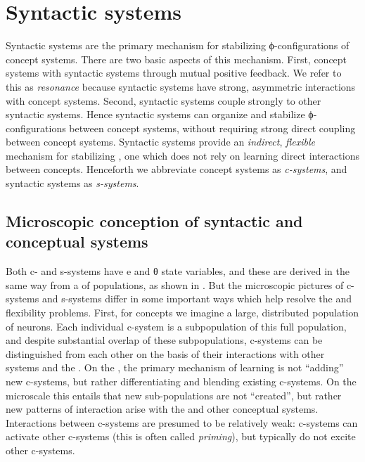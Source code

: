 \section{Syntactic systems}

Syntactic systems are the primary mechanism for stabilizing ϕ-configurations of concept systems. There are two basic aspects of this mechanism. First, concept systems  with syntactic systems through mutual positive feedback. We refer to this as \textit{resonance} because syntactic systems have strong, asymmetric interactions with concept systems. Second, syntactic systems couple strongly to other syntactic systems. Hence syntactic systems can organize and stabilize ϕ-configurations between concept systems, without requiring strong direct coupling between concept systems. Syntactic systems provide an \textit{indirect}, \textit{flexible} mechanism for stabilizing , one which does not rely on learning direct interactions between concepts. Henceforth we abbreviate concept systems as \textit{c-systems}, and syntactic systems as \textit{s-systems}. 

\subsection{Microscopic conception of syntactic and conceptual systems}

Both c- and s-systems have e and θ state variables, and these are derived in the same way from a  of populations, as shown in {}. But the microscopic pictures of c-systems and s-systems differ in some important ways which help resolve the  and flexibility problems. First, for concepts we imagine a large, distributed population of neurons. Each individual c-system is a subpopulation of this full population, and despite substantial overlap of these subpopulations, c-systems can be distinguished from each other on the basis of their interactions with other systems and the  . On the , the primary mechanism of learning is not “adding” new c-systems, but rather differentiating and blending existing c-systems. On the microscale this entails that new sub-populations are not “created”, but rather new patterns of interaction arise with the   and other conceptual systems. Interactions between c-systems are presumed to be relatively weak: c-systems can activate other c-systems (this is often called \textit{priming}), but typically do not excite other c-systems.

